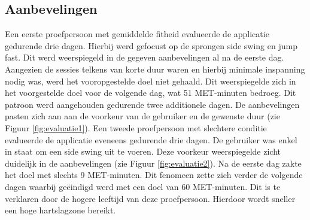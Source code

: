 \subsection{Aanbevelingen}
Een eerste proefpersoon met gemiddelde fitheid evalueerde de applicatie gedurende drie dagen. Hierbij werd gefocust op de sprongen side swing en jump fast. Dit werd weerspiegeld in de gegeven aanbevelingen al na de eerste dag. Aangezien de sessies telkens van korte duur waren en hierbij minimale inspanning nodig was, werd het vooropgestelde doel niet gehaald. Dit weerspiegelde zich in het voorgestelde doel voor de volgende dag, wat 51 MET-minuten bedroeg. Dit patroon werd aangehouden gedurende twee additionele dagen. De aanbevelingen pasten zich aan aan de voorkeur van de gebruiker en de gewenste duur (zie Figuur \ref{fig:evaluatie1}).
Een tweede proefpersoon met slechtere conditie evalueerde de applicatie eveneens gedurende drie dagen. De gebruiker was enkel in staat om een side swing uit te voeren. Deze voorkeur weerspiegelde zicht duidelijk in de aanbevelingen (zie Figuur \ref{fig:evaluatie2}). Na de eerste dag zakte het doel met slechts 9 MET-minuten. Dit fenomeen zette zich verder de volgende dagen waarbij geëindigd werd met een doel van 60 MET-minuten. Dit is te verklaren door de hogere leeftijd van deze proefpersoon. Hierdoor wordt sneller een hoge hartslagzone bereikt.

\begin{figure}[!htpd]
\centering
\begin{floatrow}
\end{floatrow}
\end{figure}